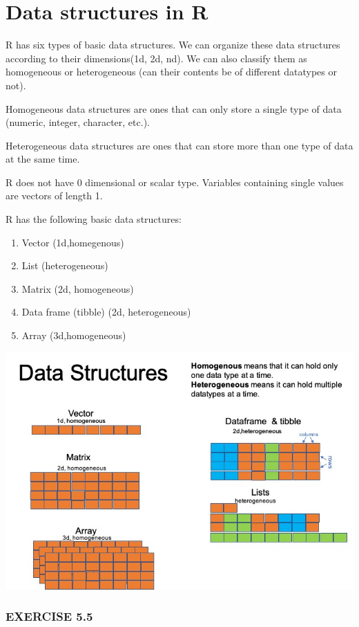 \documentclass[
]{book}
\providecommand{\tightlist}{%
  \setlength{\itemsep}{0pt}\setlength{\parskip}{0pt}}
\begin{document}
\hypertarget{data-structures-in-r}{%
\section{Data structures in R}\label{data-structures-in-r}}

R has six types of basic data structures. We can organize these data structures according to their dimensions(1d, 2d, nd). We can also classify them as homogeneous or heterogeneous (can their contents be of different datatypes or not).

Homogeneous data structures are ones that can only store a single type of data (numeric, integer, character, etc.).

Heterogeneous data structures are ones that can store more than one type of data at the same time.

R does not have 0 dimensional or scalar type. Variables containing single values are vectors of length 1.

R has the following basic data structures:

\begin{enumerate}
\def\labelenumi{\arabic{enumi}.}
\tightlist
\item
  Vector (1d,homegenous)
\item
  List (heterogeneous)
\item
  Matrix (2d, homogeneous)
\item
  Data frame (tibble) (2d, heterogeneous)
\item
  Array (3d,homogeneous)
\end{enumerate}

\includegraphics{data_s.jpg}

\hypertarget{exercise-5.5}{%
\subsubsection*{EXERCISE 5.5}\label{exercise-5.5}}
\end{document}
